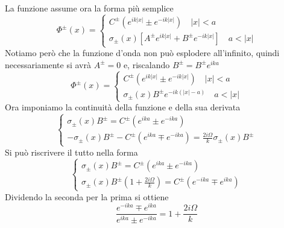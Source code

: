 \documentclass[a4paper]{article}
\begin{document}
        La funzione assume ora la forma più semplice
        \begin{equation*}
            \Phi^\pm(x)=
            \begin{cases}
                C^\pm \left(e^{ik\left\lvert x\right\rvert }\pm e^{-ik\left\lvert x\right\rvert }\right)\quad \left\lvert x\right\rvert<a\\
                \sigma_\pm(x)\left[A^\pm e^{ik\left\lvert x\right\rvert }+B^\pm e^{-ik\left\lvert x\right\rvert }\right]\quad a<\left\lvert x\right\rvert
            \end{cases}
        \end{equation*}
        Notiamo però che la funzione d'onda non può esplodere all'infinito, quindi necessariamente si avrà $A^\pm=0$ e, riscalando $B^\pm=B^\pm e^{ika}$
        \begin{equation*}
            \Phi^\pm(x)=
            \begin{cases}
                C^\pm \left(e^{ik\left\lvert x\right\rvert }\pm e^{-ik\left\lvert x\right\rvert }\right)\quad \left\lvert x\right\rvert<a\\
                \sigma_\pm(x)B^\pm e^{-ik(\left\lvert x\right\rvert-a)}\quad a<\left\lvert x\right\rvert
            \end{cases}
        \end{equation*}
        Ora imponiamo la continuità della funzione e della sua derivata 
        \begin{equation}
            \begin{cases}
                \sigma_\pm(x)B^\pm=C^\pm \left(e^{ika}\pm e^{-ika}\right)\\
                -\sigma_\pm(x)B^\pm-C^\pm \left(e^{ika}\mp e^{-ika}\right)=\frac{2i\Omega}{k}\sigma_\pm(x)B^\pm
            \end{cases}
        \end{equation}
        Si può riscrivere il tutto nella forma
        \begin{equation}
            \begin{cases}
                \sigma_\pm(x)B^\pm=C^\pm \left(e^{ika}\pm e^{-ika}\right)\\
                \sigma_\pm(x)B^\pm\left(1+\frac{2i\Omega}{k}\right)=C^\pm \left(e^{-ika}\mp e^{ika}\right)
            \end{cases}
        \end{equation}
        Dividendo la seconda per la prima si ottiene
        \begin{equation*}
            \frac{e^{-ika}\mp e^{ika}}{e^{ika}\pm e^{-ika}}=1+\frac{2i\Omega}{k}
        \end{equation*}
\end{document}
